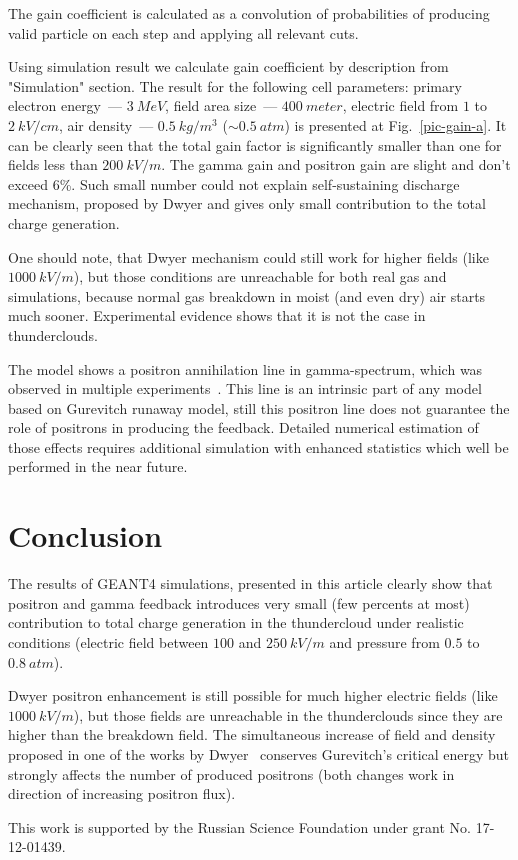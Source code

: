 \documentclass[utf8]{webofc}
\begin{document}
    The gain coefficient is calculated as a convolution of probabilities of producing valid particle on each step and applying all relevant cuts.
    
    Using simulation result we calculate gain coefficient by description from "Simulation" section. The result for the following cell parameters: primary electron energy~--- $3~MeV$, field area size~--- $400~meter$, electric field from $1$ to $2~kV/cm$, air density~--- $0.5~kg/m^3$ ($\sim 0.5~atm$) is presented at Fig.~\ref{pic-gain-a}. It can be clearly seen that the total gain factor is significantly smaller than one for fields less than $200~kV/m$. The gamma gain and positron gain are slight and don't exceed 6\%. Such small number could not explain self-sustaining discharge mechanism, proposed by Dwyer and gives only small contribution to the total charge generation.
    
    One should note, that Dwyer mechanism could still work for higher fields (like $1000~kV/m$), but those conditions are unreachable for both real gas and simulations, because normal gas breakdown in moist (and even dry) air starts much sooner. Experimental evidence shows that it is not the case in thunderclouds.
    
    The model shows a positron annihilation line in gamma-spectrum, which was observed in multiple experiments~\cite{dwyer2015positron}. This line is an intrinsic part of any model based on Gurevitch runaway model, still this positron line does not guarantee the role of positrons in producing the feedback. Detailed numerical estimation of those effects requires additional simulation with enhanced statistics which well be performed in the near future.
    
    \section{Conclusion}
    
    The results of GEANT4 simulations, presented in this article clearly show that positron and gamma feedback introduces very small (few percents at most) contribution to total charge generation in the thundercloud under realistic conditions (electric field between $100$ and $250~kV/m$ and pressure from $0.5$ to $0.8~atm$). 
    
    Dwyer positron enhancement is still possible for much higher electric fields (like $1000~kV/m$), but those fields are unreachable in the thunderclouds since they are higher than the breakdown field. The simultaneous increase of field and density proposed in one of the works by Dwyer~\cite{dwyer2003fundamental} conserves Gurevitch's critical energy but strongly affects the number of produced positrons (both changes work in direction of increasing positron flux).
    
    This work is supported by the Russian Science Foundation under grant No. 17-12-01439.
    
    {}
\end{document}
